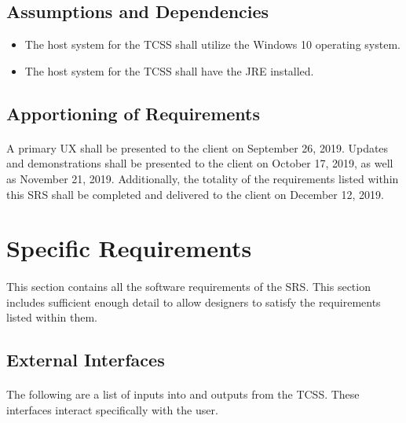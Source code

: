 \documentclass{article}
\begin{document}
    \subsection{Assumptions and Dependencies}
    \begin{itemize}
        \item The host system for the TCSS shall utilize the Windows 10 operating system.
        \item The host system for the TCSS shall have the JRE installed.
    \end{itemize}

    \subsection{Apportioning of Requirements}
    \paragraph{}
    A primary UX shall be presented to the client on September 26, 2019. Updates and demonstrations shall be presented to the client on October 17, 2019, as well as November 21, 2019. Additionally, the totality of the requirements listed within this SRS  shall be completed and delivered to the client on December 12, 2019.
   
\section{Specific Requirements}
\paragraph{}
This section contains all the software requirements of the SRS. This section includes sufficient enough detail to allow designers to satisfy the requirements listed within them.

    \subsection{External Interfaces}
    \paragraph{}
    The following are a list of inputs into and outputs from the TCSS. These interfaces  interact specifically with the user.
    
\end{document}
